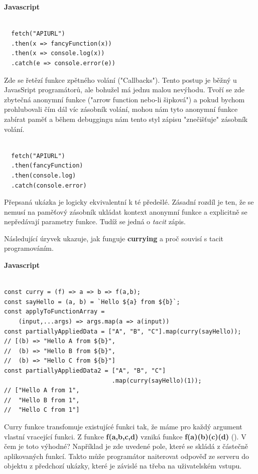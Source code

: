 \documentclass[male,czech]{kithesis}
\begin{document}
\textbf{Javascript}
\begin{verbatim}

  fetch("APIURL")
  .then(x => fancyFunction(x))
  .then(x => console.log(x))
  .catch(e => console.error(e))

\end{verbatim}

Zde se řetězí funkce zpětného volání ("Callbacks"). 
Tento postup je běžný u JavasSript programátorů,
ale bohužel má jednu malou nevýhodu.
Tvoří se zde zbytečná anonymní funkce ("arrow function nebo-li šipková") 
a pokud bychom prohlubovali čím dál víc zásobník volání,
mohou nám tyto anonymní funkce zabírat paměť a 
během debuggingu nám tento styl zápisu "znečišťuje" 
zásobník volání. 

\begin{verbatim}

  fetch("APIURL")
  .then(fancyFunction)
  .then(console.log)
  .catch(console.error)

\end{verbatim}

Přepsaná ukázka je logicky ekvivalentní k té předešlé. 
Zásadní rozdíl je ten, 
že se nemusí na paměťový zásobník ukládat kontext anonymní funkce 
a explicitně se nepředávají parametry funkce. 
Tudíž se jedná o \textit{tacit} zápis.

Následující úryvek ukazuje, 
jak funguje \textbf{currying} a proč souvisí s tacit programováním.

\textbf{Javascript}
\begin{verbatim}

const curry = (f) => a => b => f(a,b);
const sayHello = (a, b) = `Hello ${a} from ${b}`;
const applyToFunctionArray = 
    (input,...args) => args.map(a => a(input))
const partiallyAppliedData = ["A", "B", "C"].map(curry(sayHello)); 
// [(b) => "Hello A from ${b}", 
//  (b) => "Hello B from ${b}", 
//  (b) => "Hello C from ${b}"]
const partiallyAppliedData2 = ["A", "B", "C"]
                              .map(curry(sayHello)(1)); 
// ["Hello A from 1", 
//  "Hello B from 1", 
//  "Hello C from 1"]

\end{verbatim}
Curry funkce transfomuje existujícé funkci tak, 
že máme pro každý argument vlastní vracející funkci. 
Z funkce \textbf{f(a,b,c,d)} vzniká funkce \textbf{f(a)(b)(c)(d)} (\cite{Currying}).
V čem je toto výhodné?
Například je zde uvedené pole, 
které se skládá z částečně aplikovaných funkcí. 
Takto může programátor naiterovat odpověď ze serveru do objektu z předchozí ukázky,
které je závislé na třeba na uživatelském vstupu. 
\end{document}
